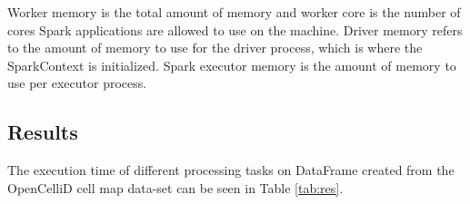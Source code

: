 Worker memory is the total amount of memory and worker core is the number of cores Spark applications are allowed to use on the machine. Driver memory refers to the amount of memory to use for the driver process, which is where the SparkContext is initialized. Spark executor memory is the amount of memory to use per executor process. %
\cite{spark:rdds}

\subsection{Results}
The execution time of different processing tasks on DataFrame created from the OpenCelliD cell map data-set can be seen in Table \ref{tab:res}.

\begin{table}[h]
    \centering
    \caption{Run-times of data processing tasks with different test clusters in seconds}
    \label{tab:res}
\end{table}

